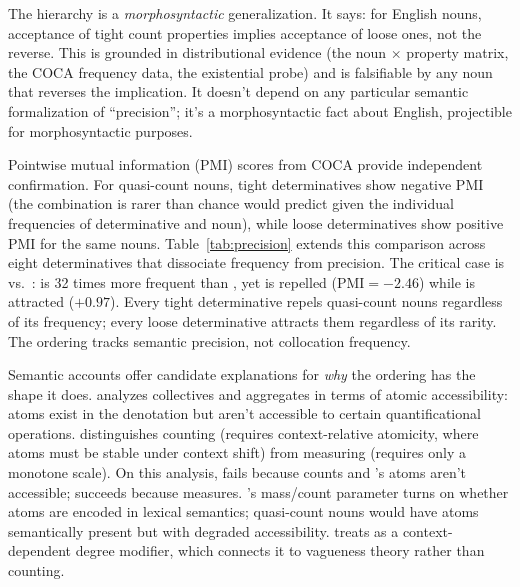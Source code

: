 \documentclass[12pt,a4paper]{article}
\begin{document}
The hierarchy is a \textit{morphosyntactic} generalization. It says: for English nouns, acceptance of tight count properties implies acceptance of loose ones, not the reverse. This is grounded in distributional evidence (the noun $\times$ property matrix, the COCA frequency data, the existential probe) and is falsifiable by any noun that reverses the implication. It doesn't depend on any particular semantic formalization of \enquote{precision}; it's a morphosyntactic fact about English, projectible for morphosyntactic purposes.

Pointwise mutual information (PMI) scores from COCA provide independent confirmation. For quasi-count nouns, tight determinatives show negative PMI (the combination is rarer than chance would predict given the individual frequencies of determinative and noun), while loose determinatives show positive PMI for the same nouns. Table~\ref{tab:precision} extends this comparison across eight determinatives that dissociate frequency from precision. The critical case is  vs.\ :  is 32 times more frequent than , yet  is repelled ($\text{PMI} = -2.46$) while  is attracted ($+0.97$). Every tight determinative repels quasi-count nouns regardless of its frequency; every loose determinative attracts them regardless of its rarity. The ordering tracks semantic precision, not collocation frequency.

Semantic accounts offer candidate explanations for \textit{why} the ordering has the shape it does. \textcite{grimm2018} analyzes collectives and aggregates in terms of atomic accessibility: atoms exist in the denotation but aren't accessible to certain quantificational operations. \textcite{rothstein2010} distinguishes counting (requires context-relative atomicity, where atoms must be stable under context shift) from measuring (requires only a monotone scale). On this analysis,  fails because  counts and 's atoms aren't accessible;  succeeds because  measures. \textcite{chierchia1998}'s mass/count parameter turns on whether atoms are encoded in lexical semantics; quasi-count nouns would have atoms semantically present but with degraded accessibility. \textcite{hackl2000} treats  as a context-dependent degree modifier, which connects it to vagueness theory rather than counting.
\end{document}
